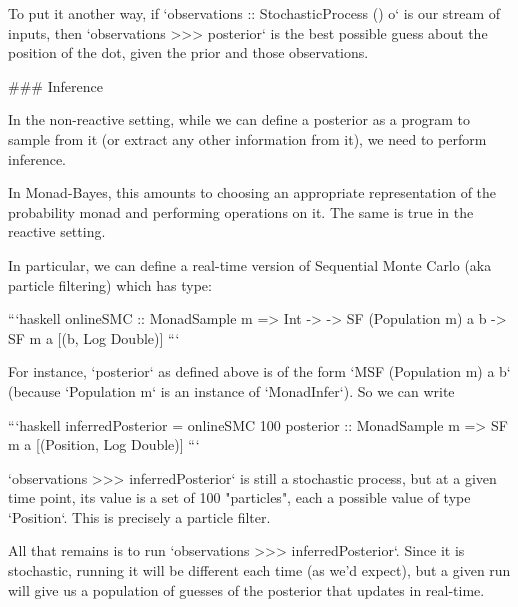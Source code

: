 To put it another way, if `observations :: StochasticProcess () o` is our stream of inputs, then `observations >>> posterior` is the best possible guess about the position of the dot, given the prior and those observations.

### Inference

In the non-reactive setting, while we can define a posterior as a program
    to sample from it (or extract any other information from it), we need to perform inference. 

In Monad-Bayes, this amounts to choosing an appropriate representation of the probability monad and performing operations on it. The same is true in the reactive setting.

In particular, we can define a real-time version of Sequential Monte Carlo (aka particle filtering) which has type:

```haskell
onlineSMC :: MonadSample m => Int ->
  -> SF (Population m) a b
  -> SF m a [(b, Log Double)]
```

For instance, `posterior` as defined above is of the form `MSF (Population m) a b` (because `Population m` is an instance of `MonadInfer`). So we can write

```haskell
inferredPosterior = onlineSMC 100 posterior :: MonadSample m => SF m a [(Position, Log Double)] 
```

`observations >>> inferredPosterior` is still a stochastic process, but at a given time point, its value is a set of 100 "particles", each a possible value of type `Position`. This is precisely a particle filter.

All that remains is to run `observations >>> inferredPosterior`. Since it is stochastic, running it will be different each time (as we'd expect), but a given run will give us a population of guesses of the posterior that updates in real-time.
